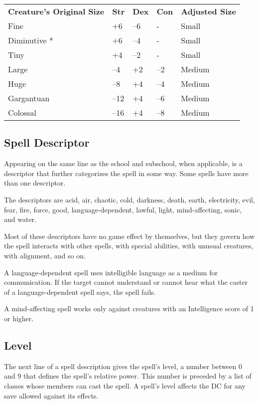 \begin{table}
\sffamily
 \begin{tabular}{lllll}
\textbf{Creature's Original Size} & \textbf{Str} & \textbf{Dex} & \textbf{Con} & \textbf{Adjusted Size}\\
Fine & +6 & --6 & - & Small\\
Diminutive * & +6 & --4 & - & Small\\
Tiny & +4 & --2 & - & Small\\
Large & --4 & +2 & --2 & Medium\\
Huge & --8 & +4 & --4 & Medium\\
Gargantuan & --12 & +4 & --6 & Medium\\
Colossal & --16 & +4 & --8 & Medium\\
 \end{tabular}

\end{table}

				
\subsection{Spell Descriptor}

				
Appearing on the same line as the school and subschool, when applicable, is a descriptor that further categorizes the spell in some way. Some spells have more than one descriptor.
				
The descriptors are acid, air, chaotic, cold, darkness, death, earth, electricity, evil, fear, fire, force, good, language-dependent, lawful, light, mind-affecting, sonic, and water.
				
Most of these descriptors have no game effect by themselves, but they govern how the spell interacts with other spells, with special abilities, with unusual creatures, with alignment, and so on.
				
A language-dependent spell uses intelligible language as a medium for communication. If the target cannot understand or cannot hear what the caster of a language-dependent spell says, the spell fails.
				
A mind-affecting spell works only against creatures with an Intelligence score of 1 or higher.
				
\subsection{Level}

				
The next line of a spell description gives the spell's level, a number between 0 and 9 that defines the spell's relative power. This number is preceded by a list of classes whose members can cast the spell. A spell's level affects the DC for any save allowed against its effects.
				
